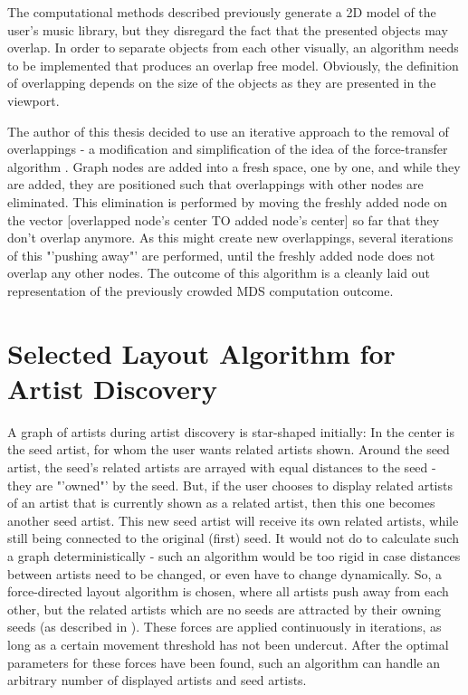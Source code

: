 The computational methods described previously generate a 2D model of the user's music library, but they disregard the fact that the presented objects may overlap. In order to separate objects from each other visually, an algorithm needs to be implemented that produces an overlap free model. Obviously, the definition of overlapping depends on the size of the objects as they are presented in the viewport.

The author of this thesis decided to use an iterative approach to the removal of overlappings - a modification and simplification of the idea of the force-transfer algorithm \cite{Huang03force-transfer:a}. Graph nodes are added into a fresh space, one by one, and while they are added, they are positioned such that overlappings with other nodes are eliminated. This elimination is performed by moving the freshly added node on the vector [overlapped node's center TO added node's center] so far that they don't overlap anymore. As this might create new overlappings, several iterations of this "'pushing away"' are performed, until the freshly added node does not overlap any other nodes. The outcome of this algorithm is a cleanly laid out representation of the previously crowded MDS computation outcome.

\section{Selected Layout Algorithm for Artist Discovery}
\label{sec:selected-algorithm-discovery}

A graph of artists during artist discovery is star-shaped initially: In the center is the seed artist, for whom the user wants related artists shown. Around the seed artist, the seed's related artists are arrayed with equal distances to the seed - they are "'owned"' by the seed. But, if the user chooses to display related artists of an artist that is currently shown as a related artist, then this one becomes another seed artist. This new seed artist will receive its own related artists, while still being connected to the original (first) seed. It would not do to calculate such a graph deterministically - such an algorithm would be too rigid in case distances between artists need to be changed, or even have to change dynamically. So, a force-directed layout algorithm is chosen, where all artists push away from each other, but the related artists which are no seeds are attracted by their owning seeds (as described in \cite{Kobourov04}). These forces are applied continuously in iterations, as long as a certain movement threshold has not been undercut. After the optimal parameters for these forces have been found, such an algorithm can handle an arbitrary number of displayed artists and seed artists.

